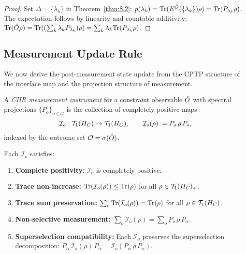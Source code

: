 \begin{proof}
Set $\Delta = \{\lambda_k\}$ in Theorem~\ref{thm:8.2}:
$p(\lambda_k) = \mathrm{Tr}(E^{\hat{O}}(\{\lambda_k\})\rho)
= \mathrm{Tr}(P_{\lambda_k}\rho)$.  The expectation follows by linearity and
countable additivity: $\mathrm{Tr}(\hat{O}\rho) = \mathrm{Tr}((\sum_k \lambda_k
P_{\lambda_k})\rho) = \sum_k \lambda_k \mathrm{Tr}(P_{\lambda_k}\rho)$.
\end{proof}

\subsection{Measurement Update Rule}
\label{sec:ch8:update}

We now derive the post-measurement state update from the CPTP structure
of the interface map and the projection structure of measurement.

\begin{definition}
\label{def:8.7}
A \emph{CIIR measurement instrument} for a constraint observable
$\hat{O}$ with spectral projections $\{P_o\}_{o \in \mathcal{O}}$ is
the collection of completely positive maps
\[
  \mathcal{I}_o : \mathcal{T}_1(H_C) \to \mathcal{T}_1(H_C),
  \qquad
  \mathcal{I}_o(\rho) := P_o\,\rho\,P_o,
\]
indexed by the outcome set $\mathcal{O} = \sigma(\hat{O})$.
\end{definition}

\begin{lemma}
\label{lem:8.3}
Each $\mathcal{I}_o$ satisfies:
\begin{enumerate}
  \item[\textup{(i)}] \textbf{Complete positivity:} $\mathcal{I}_o$ is
    completely positive.
  \item[\textup{(ii)}] \textbf{Trace non-increase:}
    $\mathrm{Tr}(\mathcal{I}_o(\rho)) \leq \mathrm{Tr}(\rho)$ for all
    $\rho \in \mathcal{T}_1(H_C)_+$.
  \item[\textup{(iii)}] \textbf{Trace sum preservation:}
    $\sum_o \mathrm{Tr}(\mathcal{I}_o(\rho)) = \mathrm{Tr}(\rho)$ for all
    $\rho \in \mathcal{T}_1(H_C)$.
  \item[\textup{(iv)}] \textbf{Non-selective measurement:}
    $\sum_o \mathcal{I}_o(\rho) = \sum_o P_o\,\rho\,P_o$.
  \item[\textup{(v)}] \textbf{Superselection compatibility:}
    Each $\mathcal{I}_o$ preserves the superselection decomposition:
    $P_\alpha\,\mathcal{I}_o(\rho)\,P_\alpha
    = \mathcal{I}_o(P_\alpha\,\rho\,P_\alpha)$.
\end{enumerate}
\end{lemma}


